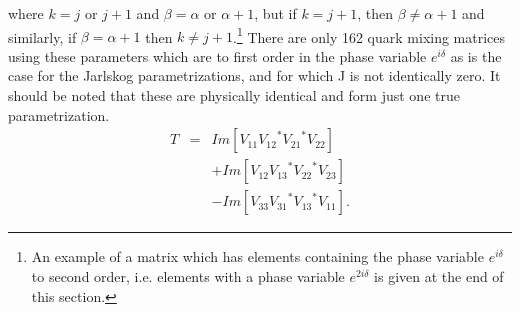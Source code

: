 \documentclass{blois}
\def\bea{\begin{eqnarray}}
\def\eea{\end{eqnarray}}
\begin{document}
where $ k = j$ or $j+1$ and $\beta = \alpha$ or $\alpha+1$, but if
$k = j + 1$, then $\beta \neq \alpha + 1$ and similarly, if
$\beta = \alpha + 1$ then $ k \neq j + 1$.\footnote{An example of a
matrix which has elements
containing the phase variable $e^{i \delta}$ to second order, i.e.
elements with a
phase variable $e^{2i \delta}$ is given at the end of this section.}
   There are only 162 quark mixing matrices using these parameters
which are
to first order in the phase variable $e^{i \delta}$ as is the case for
the Jarlskog parametrizations, and for which J is not identically
zero.
It should be noted that these are physically identical and
form just one true parametrization.
\bea
T & = & Im[V_{11} {V_{12}}^* {V_{21}}^* V_{22}]  \nonumber \\
&  & + Im[V_{12} {V_{13}}^* {V_{22}}^* V_{23}]   \nonumber \\
&  & - Im[V_{33} {V_{31}}^* {V_{13}}^* V_{11}].
\label{eq:sp}
\eea
\end{document}
